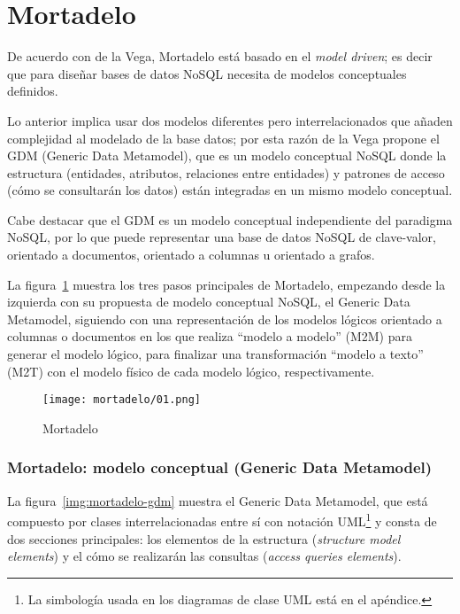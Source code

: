 \section{Mortadelo}
De acuerdo con de la Vega\cite{de_la_vega_mortadelo_2020}, Mortadelo está basado en el \textit{model driven}; es decir que para diseñar bases de datos NoSQL necesita de modelos conceptuales definidos.


Lo anterior implica usar dos modelos diferentes pero interrelacionados que añaden complejidad al modelado de la base datos; por esta razón de la Vega propone el GDM (Generic Data Metamodel), que es un modelo conceptual NoSQL donde la estructura (entidades, atributos, relaciones entre entidades) y patrones de acceso (cómo se consultarán los datos) están integradas en un mismo modelo conceptual.


Cabe destacar que el GDM es un modelo conceptual independiente del paradigma NoSQL, por lo que puede representar una base de datos NoSQL de clave-valor, orientado a documentos, orientado a columnas u orientado a grafos.

La figura~\ref{img:mortadelo-process} muestra los tres pasos principales de Mortadelo, empezando desde la izquierda con su propuesta de modelo conceptual NoSQL, el Generic Data Metamodel, siguiendo con una representación de los modelos lógicos orientado a columnas o documentos en los que realiza ``modelo a modelo'' (M2M) para generar el modelo lógico, para finalizar una transformación ``modelo a texto'' (M2T) con el modelo físico de cada modelo lógico, respectivamente.


\begin{figure}[H] 
    \centering
    \texttt{[image: mortadelo/01.png]}
    \caption{Mortadelo}
    \label{img:mortadelo-process}
\end{figure}
\subsubsection*{Mortadelo: modelo conceptual (Generic Data Metamodel)}

La figura~\ref{img:mortadelo-gdm} muestra el Generic Data Metamodel, que está compuesto por clases interrelacionadas entre sí con notación UML\footnote{La simbología usada en los diagramas de clase UML está en el apéndice.} y consta de dos secciones principales: los elementos de la estructura (\textit{structure model elements}) y el cómo se realizarán las consultas (\textit{access queries elements}).


